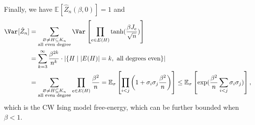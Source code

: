 \begin{explanation}
	Finally, we have \(\mathbb{E}_{}[\hat{Z} _n(\beta , 0)] = 1\) and
	\[
		\begin{split}
			\Var_{}[\hat{Z} _n]
			 & = \sum_{\substack{\varnothing \neq H \subseteq K_n                                                                              \\ \text{all even degree} }} \Var_{}\left[\prod_{e \in E(H)} \tanh (\frac{\beta J_e}{\sqrt{n} })\right] \\
			 & = \sum_{k=3}^{\infty} \frac{\beta ^{2k}}{n^k} \cdot \lvert \{ H \mid \lvert E(H) \rvert = k, \text{ all degrees even} \} \rvert \\
			 & = \sum_{\substack{\varnothing \neq H \subseteq K_n                                                                              \\ \text{all even degree} }} \prod_{e \in E(H)} \frac{\beta ^2}{n}
			= \mathbb{E}_{\sigma }\left[ \prod_{i < j} \left( 1 + \sigma _i \sigma _j \frac{\beta ^2}{n} \right) \right]
			\leq \mathbb{E}_{\sigma }\left[ \exp (\frac{\beta ^2}{n} \sum_{i < j} \sigma _i \sigma _j) \right],
		\end{split}
	\]
	which is the CW Ising model free-energy, which can be further bounded when \(\beta < 1\).
\end{explanation}
